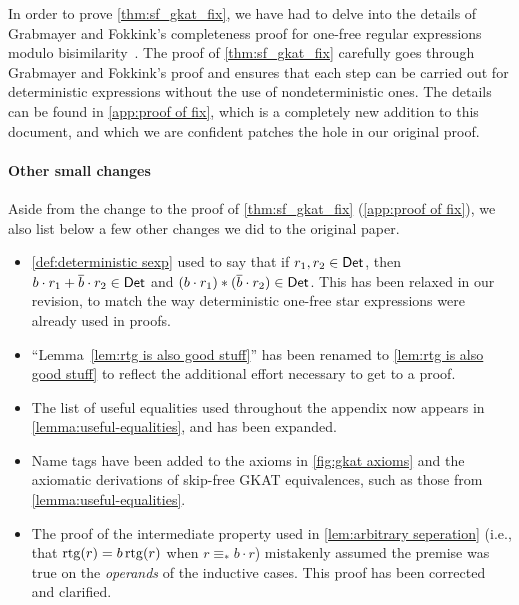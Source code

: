 \documentclass[orivec,envcountsect,envcountsame]{llncs}
\begin{document}
In order to prove \cref{thm:sf_gkat_fix}, we have had to delve into the details of Grabmayer and Fokkink's completeness proof for one-free regular expressions modulo bisimilarity~\cite{onefreeregexlics}.
The proof of \cref{thm:sf_gkat_fix} carefully goes through Grabmayer and Fokkink's proof and ensures that each step can be carried out for deterministic expressions without the use of nondeterministic ones.
The details can be found in \cref{app:proof of fix}, which is a completely new addition to this document, and which we are confident patches the hole in our original proof.

\paragraph*{Other small changes}
Aside from the change to the proof of \cref{thm:sf_gkat_fix} (\cref{app:proof of fix}), we also list below a few other changes we did to the original paper.
\begin{itemize}
	\item \cref{def:deterministic sexp} used to say that if $r_1, r_2 \in \mathsf{Det}$, then $b \cdot r_1 + \overline{b} \cdot r_2 \in \mathsf{Det}$ and $(b \cdot r_1) * (\overline{b} \cdot r_2) \in \mathsf{Det}$.
    This has been relaxed in our revision, to match the way deterministic one-free star expressions were already used in proofs.

	\item ``Lemma~\ref{lem:rtg is also good stuff}'' has been renamed to \cref{lem:rtg is also good stuff} to reflect the additional effort necessary to get to a proof.

	\item The list of useful equalities used throughout the appendix now appears in \cref{lemma:useful-equalities}, and has been expanded.

	\item Name tags have been added to the axioms in \cref{fig:gkat axioms} and the axiomatic derivations of skip-free GKAT equivalences, such as those from \cref{lemma:useful-equalities}.

	\item The proof of the intermediate property used in \cref{lem:arbitrary seperation} (i.e., that $\operatorname{rtg}(r) = b \operatorname{rtg}(r)$ when $r \equiv_* b \cdot r$) mistakenly assumed the premise was true on the \emph{operands} of the inductive cases.
	This proof has been corrected and clarified.
\end{itemize}


\fi%
\end{document}
